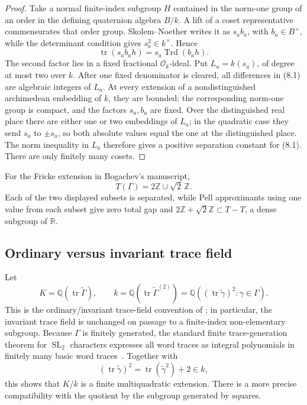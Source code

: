 \documentclass[11pt,reqno]{amsart}
\theoremstyle{definition}
\theoremstyle{remark}
\newcommand{\R}{\mathbb R}
\newcommand{\Q}{\mathbb Q}
\newcommand{\Z}{\mathbb Z}
\newcommand{\cO}{\mathcal O}
\newcommand{\Tr}{\operatorname{tr}}
\newcommand{\Trd}{\operatorname{Trd}}
\newcommand{\SL}{\operatorname{SL}}
\begin{document}
\begin{proof}
Take a normal finite-index subgroup \(H\) contained in the norm-one group of
an order in the defining quaternion algebra \(B/k\).  A lift of a coset
representative commensurates that order group.  Skolem--Noether
\cite[Section~12.6]{Pierce} writes it as
\(s_ab_a\), with \(b_a\in B^\times\), while the determinant condition gives
\(s_a^2\in k^\times\).  Hence
\[
 \Tr(s_ab_ah)=s_a\Trd(b_ah).
\tag{8.1}
\]
The second factor lies in a fixed fractional \(\cO_k\)-ideal.  Put
\(L_a=k(s_a)\), of degree at most two over \(k\).  After one fixed
denominator is cleared, all differences in (8.1) are algebraic integers of
\(L_a\).  At every extension of a nondistinguished archimedean embedding of
\(k\), they are bounded: the corresponding norm-one group is compact, and
the factors \(s_a,b_a\) are fixed.  Over the distinguished real place there
are either one or two embeddings of \(L_a\); in the quadratic case they send
\(s_a\) to \(\pm s_a\), so both absolute values equal the one at the
distinguished place.
The norm inequality in \(L_a\) therefore gives a positive separation
constant for (8.1).  There are only finitely many cosets.
\end{proof}

For the Fricke extension in Bogachev's manuscript,
\[
 T(\Gamma)=2\Z\cup\sqrt2\,\Z.
\tag{8.2}
\]
Each of the two displayed subsets is separated, while Pell approximants
using one value from each subset give zero total gap and
\(2\Z+\sqrt2\Z\subset T-T\), a dense subgroup of \(\R\).

\subsection{Ordinary versus invariant trace field}

Let
\[
 K=\Q(\Tr\widetilde\Gamma),\qquad
k=\Q(\Tr\widetilde\Gamma^{(2)})
   =\Q((\Tr\widetilde\gamma)^2:\gamma\in\Gamma).
\]
This is the ordinary/invariant trace-field convention of
\cite[Chapter~3]{MaclachlanReid}; in particular, the invariant trace field is
unchanged on passage to a finite-index non-elementary subgroup.
Because \(\Gamma\) is finitely generated, the standard finite trace-generation
theorem for \(\SL_2\) characters expresses all word traces as integral
polynomials in finitely many basic word traces~\cite{Horowitz}.  Together with
\[
 (\Tr\widetilde\gamma)^2=\Tr(\widetilde\gamma^2)+2\in k,
\tag{8.3}
\]
this shows that \(K/k\) is a finite multiquadratic extension.  There is a
more precise compatibility with the quotient by the subgroup generated by
squares.
\end{document}
